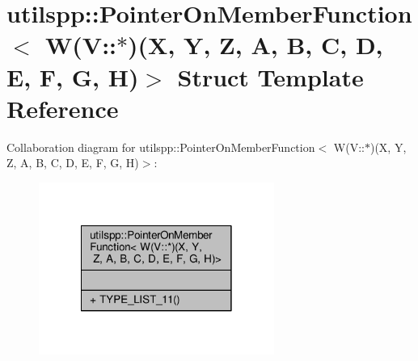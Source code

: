 \hypertarget{structutilspp_1_1PointerOnMemberFunction_3_01W_07V_1_1_5_08_07X_00_01Y_00_01Z_00_01A_00_01B_00_0c1190c13a8ba22e2b017a7c30228b2d5}{\section{utilspp\-:\-:Pointer\-On\-Member\-Function$<$ W(V\-:\-:$\ast$)(X, Y, Z, A, B, C, D, E, F, G, H)$>$ Struct Template Reference}
\label{structutilspp_1_1PointerOnMemberFunction_3_01W_07V_1_1_5_08_07X_00_01Y_00_01Z_00_01A_00_01B_00_0c1190c13a8ba22e2b017a7c30228b2d5}
}


Collaboration diagram for utilspp\-:\-:Pointer\-On\-Member\-Function$<$ W(V\-:\-:$\ast$)(X, Y, Z, A, B, C, D, E, F, G, H)$>$\-:\nopagebreak
\begin{figure}[H]
\begin{center}
\leavevmode
\includegraphics[width=218pt]{structutilspp_1_1PointerOnMemberFunction_3_01W_07V_1_1_5_08_07X_00_01Y_00_01Z_00_01A_00_01B_00_08421ae4afb25a7d77780614682f2ee2b}
\end{center}
\end{figure}
